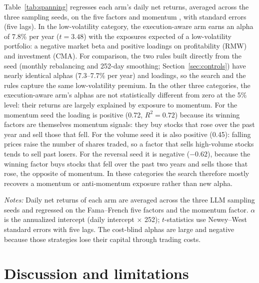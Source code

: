 \documentclass[preprint,12pt,authoryear]{elsarticle}
\newcommand{\tablenote}[1]{\par\vspace{0.4em}\begin{minipage}{\linewidth}\footnotesize #1\end{minipage}}
\begin{document}
Table~\ref{tab:spanning} regresses each arm's daily net returns, averaged across the three sampling seeds, on the \citet{fama2015} five factors and momentum \citep{carhart1997,french2026}, with \citet{newey1987} standard errors (five lags). In the low-volatility category, the execution-aware arm earns an alpha of 7.8\% per year ($t = 3.48$) with the exposures expected of a low-volatility portfolio: a negative market beta and positive loadings on profitability (RMW) and investment (CMA). For comparison, the two rules built directly from the seed (monthly rebalancing and 252-day smoothing; Section~\ref{sec:controls}) have nearly identical alphas (7.3--7.7\% per year) and loadings, so the search and the rules capture the same low-volatility premium. In the other three categories, the execution-aware arm's alphas are not statistically different from zero at the 5\% level: their returns are largely explained by exposure to momentum. For the momentum seed the loading is positive (0.72, $R^2 = 0.72$) because its winning factors are themselves momentum signals: they buy stocks that rose over the past year and sell those that fell. For the volume seed it is also positive (0.45): falling prices raise the number of shares traded, so a factor that sells high-volume stocks tends to sell past losers. For the reversal seed it is negative ($-0.62$), because the winning factor buys stocks that fell over the past two years and sells those that rose, the opposite of momentum. In these categories the search therefore mostly recovers a momentum or anti-momentum exposure rather than new alpha.

\begin{table}[t]
\centering
\caption{Factor regressions of daily out-of-sample net returns, 2006--2026.}
\label{tab:spanning}
\footnotesize
\resizebox{\linewidth}{!}{}
\tablenote{\emph{Notes:} Daily net returns of each arm are averaged across the three LLM sampling seeds and regressed on the Fama--French five factors and the momentum factor. $\alpha$ is the annualized intercept (daily intercept $\times$ 252); $t$-statistics use Newey--West standard errors with five lags. The cost-blind alphas are large and negative because those strategies lose their capital through trading costs.}
\end{table}

\section{Discussion and limitations}\label{sec:discussion}
\end{document}
